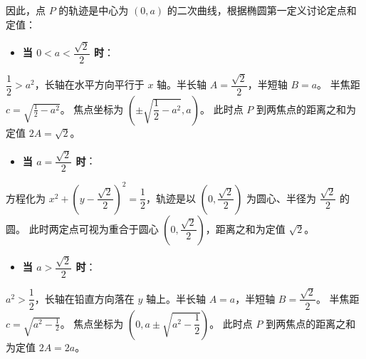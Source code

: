 \begin{answer}
因此，点 $P$ 的轨迹是中心为 $(0, a)$ 的二次曲线，根据椭圆第一定义讨论定点和定值：
\begin{itemize}
\item \textbf{当 $0 < a < \dfrac{\sqrt{2}}{2}$ 时}：
\end{itemize}
  $\dfrac{1}{2} > a^2$，长轴在水平方向平行于 $x$ 轴。半长轴 $A = \dfrac{\sqrt{2}}{2}$，半短轴 $B = a$。
  半焦距 $c = \sqrt{\frac{1}{2} - a^2}$。
  焦点坐标为 $\left(\pm\sqrt{\dfrac{1}{2} - a^2}, a\right)$。
  此时点 $P$ 到两焦点的距离之和为定值 $2A = \sqrt{2}$。
\begin{itemize}
\item \textbf{当 $a = \dfrac{\sqrt{2}}{2}$ 时}：
\end{itemize}
  方程化为 $x^2 + \left(y - \dfrac{\sqrt{2}}{2}\right)^2 = \dfrac{1}{2}$，轨迹是以 $\left(0, \dfrac{\sqrt{2}}{2}\right)$ 为圆心、半径为 $\dfrac{\sqrt{2}}{2}$ 的圆。
  此时两定点可视为重合于圆心 $\left(0, \dfrac{\sqrt{2}}{2}\right)$，距离之和为定值 $\sqrt{2}$。
\begin{itemize}
\item \textbf{当 $a > \dfrac{\sqrt{2}}{2}$ 时}：
\end{itemize}
  $a^2 > \dfrac{1}{2}$，长轴在铅直方向落在 $y$ 轴上。半长轴 $A = a$，半短轴 $B = \dfrac{\sqrt{2}}{2}$。
  半焦距 $c = \sqrt{a^2 - \frac{1}{2}}$。
  焦点坐标为 $\left(0, a \pm\sqrt{a^2 - \dfrac{1}{2}}\right)$。
  此时点 $P$ 到两焦点的距离之和为定值 $2A = 2a$。


\end{answer}
